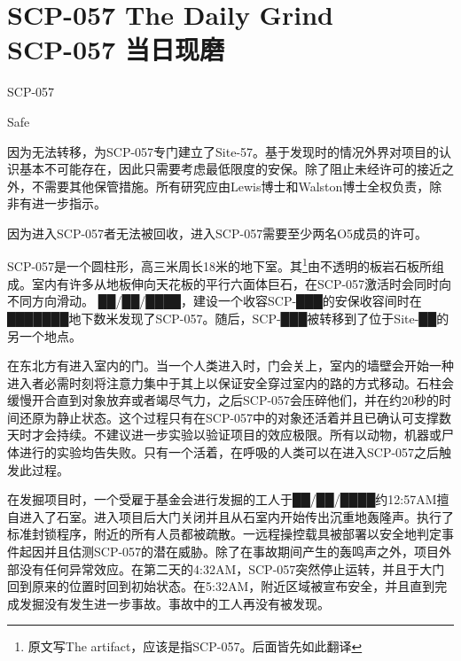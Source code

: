\chapter[SCP-057 当日现磨]{
    SCP-057 The Daily Grind\\
    SCP-057 当日现磨
}

\label{chap:SCP-057}

SCP-057

Safe

因为无法转移，为SCP-057专门建立了Site-57。基于发现时的情况外界对项目的认识基本不可能存在，因此只需要考虑最低限度的安保。除了阻止未经许可的接近之外，不需要其他保管措施。所有研究应由Lewis博士和Walston博士全权负责，除非有进一步指示。

因为进入SCP-057者无法被回收，进入SCP-057需要至少两名O5成员的许可。

SCP-057是一个圆柱形，高三米周长18米的地下室。其\footnote{原文写The artifact，应该是指SCP-057。后面皆先如此翻译}由不透明的板岩石板所组成。室内有许多从地板伸向天花板的平行六面体巨石，在SCP-057激活时会同时向不同方向滑动。 ██\slash ██\slash ████，建设一个收容SCP-███的安保收容间时在███████地下数米发现了SCP-057。随后，SCP-███被转移到了位于Site-██的另一个地点。

在东北方有进入室内的门。当一个人类进入时，门会关上，室内的墙壁会开始一种进入者必需时刻将注意力集中于其上以保证安全穿过室内的路的方式移动。石柱会缓慢开合直到对象放弃或者竭尽气力，之后SCP-057会压碎他们，并在约20秒的时间还原为静止状态。这个过程只有在SCP-057中的对象还活着并且已确认可支撑数天时才会持续。不建议进一步实验以验证项目的效应极限。所有以动物，机器或尸体进行的实验均告失败。只有一个活着，在呼吸的人类可以在进入SCP-057之后触发此过程。



在发掘项目时，一个受雇于基金会进行发掘的工人于██\slash ██\slash ████约12:57AM擅自进入了石室。进入项目后大门关闭并且从石室内开始传出沉重地轰隆声。执行了标准封锁程序，附近的所有人员都被疏散。一远程操控载具被部署以安全地判定事件起因并且估测SCP-057的潜在威胁。除了在事故期间产生的轰鸣声之外，项目外部没有任何异常效应。在第二天的4:32AM，SCP-057突然停止运转，并且于大门回到原来的位置时回到初始状态。在5:32AM，附近区域被宣布安全，并且直到完成发掘没有发生进一步事故。事故中的工人再没有被发现。



